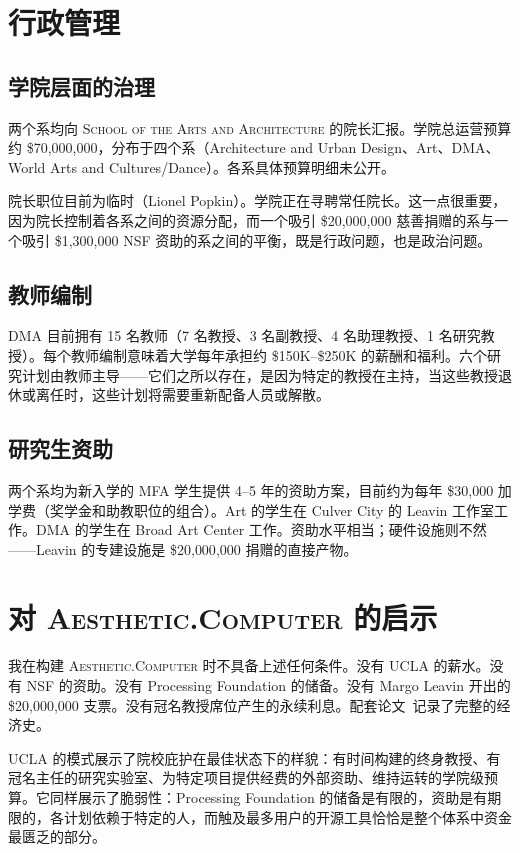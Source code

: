 \documentclass[10pt,letterpaper,twocolumn]{article}
\newcommand{\ac}{\textsc{Aesthetic.Computer}}
\newcommand{\dma}{\textsc{DMA}}
\newcommand{\sofa}{\textsc{School of the Arts and Architecture}}
\begin{document}
\section{行政管理}

\subsection{学院层面的治理}

两个系均向 \sofa{} 的院长汇报。学院总运营预算约 \$70{,}000{,}000，分布于四个系（Architecture and Urban Design、Art、\dma{}、World Arts and Cultures/Dance）。各系具体预算明细未公开。

院长职位目前为临时（Lionel Popkin）。学院正在寻聘常任院长。这一点很重要，因为院长控制着各系之间的资源分配，而一个吸引 \$20{,}000{,}000 慈善捐赠的系与一个吸引 \$1{,}300{,}000 NSF 资助的系之间的平衡，既是行政问题，也是政治问题。

\subsection{教师编制}

\dma{} 目前拥有 15 名教师（7 名教授、3 名副教授、4 名助理教授、1 名研究教授）。每个教师编制意味着大学每年承担约 \$150K--\$250K 的薪酬和福利。六个研究计划由教师主导——它们之所以存在，是因为特定的教授在主持，当这些教授退休或离任时，这些计划将需要重新配备人员或解散。

\subsection{研究生资助}

两个系均为新入学的 MFA 学生提供 4--5 年的资助方案，目前约为每年 \$30{,}000 加学费（奖学金和助教职位的组合）。Art 的学生在 Culver City 的 Leavin 工作室工作。\dma{} 的学生在 Broad Art Center 工作。资助水平相当；硬件设施则不然——Leavin 的专建设施是 \$20{,}000{,}000 捐赠的直接产物。

\section{对 \ac{} 的启示}

我在构建 \ac{} 时不具备上述任何条件。没有 UCLA 的薪水。没有 NSF 的资助。没有 Processing Foundation 的储备。没有 Margo Leavin 开出的 \$20{,}000{,}000 支票。没有冠名教授席位产生的永续利息。配套论文~\citep{scudder2026sustainability}记录了完整的经济史。

UCLA 的模式展示了院校庇护在最佳状态下的样貌：有时间构建的终身教授、有冠名主任的研究实验室、为特定项目提供经费的外部资助、维持运转的学院级预算。它同样展示了脆弱性：Processing Foundation 的储备是有限的，资助是有期限的，各计划依赖于特定的人，而触及最多用户的开源工具恰恰是整个体系中资金最匮乏的部分。
\end{document}
